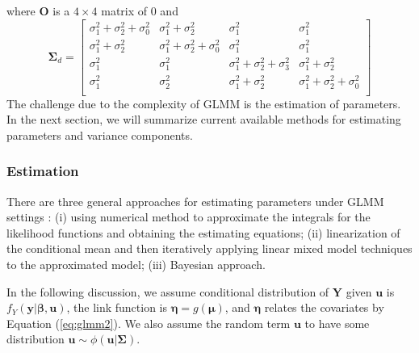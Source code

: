 	where $\bm O$ is a $4\times 4$ matrix of 0 and 
	\[
	\bm \Sigma_d = \left[
	\begin{array}{cccc}
	\sigma^2_1+ \sigma^2_2 + \sigma^2_0  & \sigma^2_1+\sigma^2_2 & \sigma^2_1 &\sigma^2_1\\
	\sigma^2_1+\sigma^2_2 & \sigma^2_1 +\sigma^2_2 +\sigma^2_0 &\sigma^2_1 &\sigma^2_1\\
	\sigma^2_1 & \sigma^2_1& \sigma^2_1+\sigma^2_2+\sigma^2_3 & \sigma^2_1 + \sigma^2_2\\
	\sigma^2_1 &\sigma^2_2 &\sigma^2_1 +\sigma^2_2 & \sigma^2_1 +\sigma^2_2 +\sigma^2_0\\
	\end{array}
	\right]
	\]
	The challenge due to the complexity of GLMM is the estimation of parameters. In the next section, we will summarize current available methods for estimating parameters and variance components.
	
	\subsubsection{Estimation}	
	There are three general approaches for estimating parameters under GLMM settings \citep[Chapter 7]{myers2012generalized}: (i) using numerical method to approximate the integrals for the likelihood functions and obtaining the estimating equations; (ii) linearization of the conditional mean and then iteratively applying linear mixed model techniques to the approximated model; (iii) Bayesian approach.  
	
	In the following discussion, we assume conditional distribution of $\bm  Y$ given $\bm u$ is  $f_{Y}(\bm y|\bm \beta, \bm u)$,  the link function is $\bm \eta = g(\bm \mu)$, and $\bm \eta$ relates the covariates by Equation (\ref{eq:glmm2}). We also assume the random term $\bm u$ to have some distribution $\bm u \sim \phi(\bm u|\bm \Sigma)$. 	

